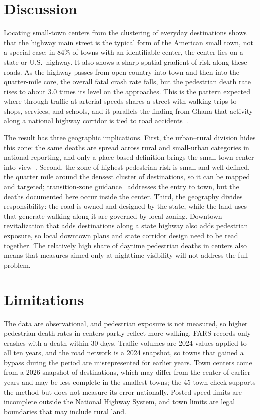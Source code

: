\documentclass[11pt,letterpaper]{article}
\begin{document}
\section{Discussion}
Locating small-town centers from the clustering of everyday destinations shows that the highway main street is the typical form of the American small town, not a special case: in 84\% of towns with an identifiable center, the center lies on a state or U.S.\ highway. It also shows a sharp spatial gradient of risk along these roads. As the highway passes from open country into town and then into the quarter-mile core, the overall fatal crash rate falls, but the pedestrian death rate rises to about 3.0 times its level on the approaches. This is the pattern expected where through traffic at arterial speeds shares a street with walking trips to shops, services, and schools, and it parallels the finding from Ghana that activity along a national highway corridor is tied to road accidents~\cite{nani2025}.

The result has three geographic implications. First, the urban--rural division hides this zone: the same deaths are spread across rural and small-urban categories in national reporting, and only a place-based definition brings the small-town center into view~\cite{nani2026a}. Second, the zone of highest pedestrian risk is small and well defined, the quarter mile around the densest cluster of destinations, so it can be mapped and targeted; transition-zone guidance~\cite{torbic} addresses the entry to town, but the deaths documented here occur inside the center. Third, the geography divides responsibility: the road is owned and designed by the state, while the land uses that generate walking along it are governed by local zoning. Downtown revitalization that adds destinations along a state highway also adds pedestrian exposure, so local downtown plans and state corridor design need to be read together. The relatively high share of daytime pedestrian deaths in centers also means that measures aimed only at nighttime visibility will not address the full problem.

\section{Limitations}
The data are observational, and pedestrian exposure is not measured, so higher pedestrian death rates in centers partly reflect more walking. FARS records only crashes with a death within 30 days. Traffic volumes are 2024 values applied to all ten years, and the road network is a 2024 snapshot, so towns that gained a bypass during the period are misrepresented for earlier years. Town centers come from a 2026 snapshot of destinations, which may differ from the center of earlier years and may be less complete in the smallest towns; the 45-town check supports the method but does not measure its error nationally. Posted speed limits are incomplete outside the National Highway System, and town limits are legal boundaries that may include rural land.
\end{document}
